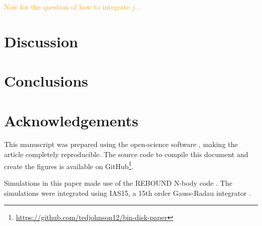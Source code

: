 \documentclass[twocolumn]{aastex631}
\newcommand\ghurl[0]{\url{https://github.com/tedjohnson12/bin-disk-paper}}
\newcommand{\TJ}[1]{\textcolor{orange}{#1}}
\begin{document}
\TJ{Now for the question of how to integrate $j$...}

\section{Discussion}
\label{sec:discussion}

\section{Conclusions}
\label{sec:conclusions}





\section{Acknowledgements}
\label{sec:ack}

This manuscript was prepared using the open-science software \href{https://show-your.work/en/latest/intro/}{\showyourwork} \citep{luger2021}, making the article completely
reproducible. The source code to compile this document and create the figures is available on GitHub\footnote{\ghurl}.

Simulations in this paper made use of the REBOUND N-body code \citep{rebound}.
The simulations were integrated using IAS15, a 15th order Gauss-Radau integrator \citep{reboundias15}. 



\end{document}
